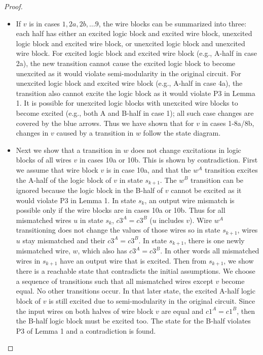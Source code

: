 \documentclass[12pt]{report}
\begin{document}
\begin{proof}
\begin{itemize}
\begin{itemize}
\item
If $v$ is in cases $1,2a,2b,\dots9$, the wire blocks can be summarized into three: each half has either an excited logic block and excited wire block, unexcited logic block and excited wire block, or unexcited logic block and unexcited wire block.  For excited logic block and excited wire block (e.g., A-half in case 2a), the new transition cannot cause the excited logic block to become unexcited as it would violate semi-modularity in the original circuit.  For unexcited logic block and excited wire block (e.g., A-half in case 4a), the transition also cannot excite the logic block as it would violate P3 in Lemma 1.  It is possible for unexcited logic blocks with unexcited wire blocks to become excited (e.g., both A and B-half in case 1); all such case changes are covered by the blue arrows.  Thus we have shown that for $v$ in cases 1-8a/8b, changes in $v$ caused by a transition in $w$ follow the state diagram.  
\item
Next we show that a transition in $w$ does not change excitations in logic blocks of all wires $v$ in cases 10a or 10b.  This is shown by contradiction.  
First we assume that wire block $v$ is in case 10a, and that the $w^A$ transition excites the A-half of the logic block of $v$ in state $s_{k+1}$.  The $w^B$ transition can be ignored because the logic block in the B-half of $v$ cannot be excited as it would violate P3 in Lemma 1.  In state $s_k$, an output wire mismatch is possible only if the wire blocks are in cases 10a or 10b.  Thus for all mismatched wires $u$ in state $s_k$, $c3^A=c3^B$ (${u}$ includes $v$).  Wire $w^A$ transitioning does not change the values of those wires so in state $s_{k+1}$, wires $u$ stay mismatched and their $c3^A=c3^B$.  In state $s_{k+1}$, there is one newly mismatched wire, $w$, which also has $c3^A=c3^B$.  In other words all mismatched wires in $s_{k+1}$ have an output wire that is excited. Then from $s_{k+1}$, we show there is a reachable state that contradicts the initial assumptions.  We choose a sequence of transitions such that all mismatched wires except $v$ become equal.  No other transitions occur.  In that later state, the excited A-half logic block of $v$ is still excited due to semi-modularity in the original circuit.  %
Since the input wires on both halves of wire block $v$ are equal and $c1^A=c1^B$, then the B-half logic block must be excited too.  The state for the B-half violates P3 of Lemma 1 and a contradiction is found. %

\end{itemize}
\end{itemize}
\end{proof}
\end{document}

